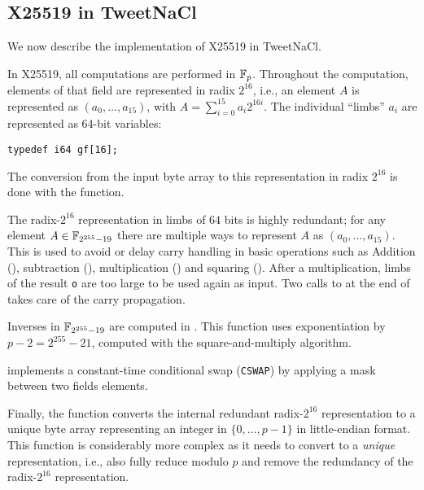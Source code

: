 \subsection{X25519 in TweetNaCl}
\label{subsec:X25519-TweetNaCl}

We now describe the implementation of X25519 in TweetNaCl.

In X25519, all computations are performed in $\mathbb{F}_{p}$.
Throughout the computation, elements of that field
are represented in radix $2^{16}$,
i.e., an element $A$ is represented as $(a_0,\dots,a_{15})$,
with $A = \sum_{i=0}^{15}a_i2^{16i}$.
The individual ``limbs'' $a_i$ are represented as
64-bit  variables:
\begin{lstlisting}[language=Ctweetnacl,stepnumber=0]
typedef i64 gf[16];
\end{lstlisting}

The conversion from the input byte array to this representation in radix
$2^{16}$ is done with the  function.

The radix-$2^{16}$ representation in limbs of $64$ bits is
highly redundant; for any element $A \in \mathbb{F}_{2^{255}-19}$ there are
multiple ways to represent $A$ as $(a_0,\dots,a_{15})$.
This is used to avoid or delay carry handling in basic operations such as
Addition (), subtraction (), multiplication ()
and squaring (). After a multiplication, limbs of the result
\texttt{o} are too large to be used again as input. Two calls to
 at the end of  takes care of the carry propagation.

Inverses in $\mathbb{F}_{2^{255}-19}$ are computed in .
This function uses exponentiation by $p - 2 = 2^{255}-21$,
computed with the square-and-multiply algorithm.

 implements a constant-time conditional swap (\texttt{CSWAP}) by
applying a mask between two fields elements.

Finally, the  function
converts the internal redundant radix-$2^{16}$
representation to a unique byte array representing an
integer in $\{0,\dots,p-1\}$ in little-endian format.
This function is considerably more complex as it needs to convert
to a \emph{unique} representation, i.e., also fully reduce modulo
$p$ and remove the redundancy of the radix-$2^{16}$ representation.

